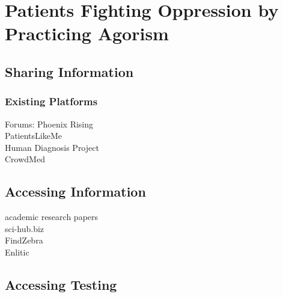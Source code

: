 \documentclass{article}
\begin{document}

\cite{CarsonDesktop}

\section{Patients Fighting Oppression by Practicing Agorism}

\subsection{Sharing Information}




\subsubsection{Existing Platforms}
Forums: Phoenix Rising\\
PatientsLikeMe\\
Human Diagnosis Project\\
CrowdMed\\

\subsection{Accessing Information}
academic research papers\\
sci-hub.biz\\
FindZebra\\
Enlitic

\cite{scholz2016platform}



\subsection{Accessing Testing}
\end{document}
